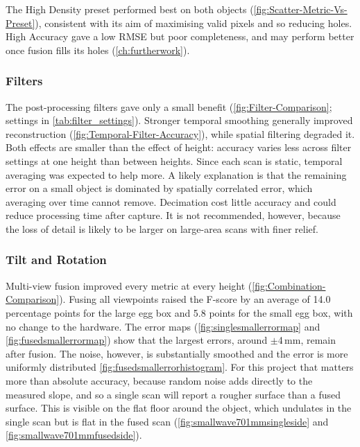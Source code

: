 The High Density preset performed best on both objects (\autoref{fig:Scatter-Metric-Vs-Preset}), consistent with its aim of maximising valid pixels and so reducing holes. High Accuracy gave a low RMSE but poor completeness, and may perform better once fusion fills its holes (\autoref{ch:furtherwork}).

\subsubsection{Filters}

The post-processing filters gave only a small benefit (\autoref{fig:Filter-Comparison}; settings in \autoref{tab:filter_settings}). Stronger temporal smoothing generally improved reconstruction (\autoref{fig:Temporal-Filter-Accuracy}), while spatial filtering degraded it. Both effects are smaller than the effect of height: accuracy varies less across filter settings at one height than between heights. Since each scan is static, temporal averaging was expected to help more. A likely explanation is that the remaining error on a small object is dominated by spatially correlated error, which averaging over time cannot remove. Decimation cost little accuracy and could reduce processing time after capture. It is not recommended, however, because the loss of detail is likely to be larger on large-area scans with finer relief.

\subsubsection{Tilt and Rotation}

Multi-view fusion improved every metric at every height (\autoref{fig:Combination-Comparison}). Fusing all viewpoints raised the F-score by an average of 14.0 percentage points for the large egg box and 5.8 points for the small egg box, with no change to the hardware. The error maps (\autoref{fig:singlesmallerrormap} and \autoref{fig:fusedsmallerrormap}) show that the largest errors, around $\pm$4\,mm, remain after fusion. The noise, however, is substantially smoothed and the error is more uniformly distributed \autoref{fig:fusedsmallerrorhistogram}. For this project that matters more than absolute accuracy, because random noise adds directly to the measured slope, and so a single scan will report a rougher surface than a fused surface. This is visible on the flat floor around the object, which undulates in the single scan but is flat in the fused scan (\autoref{fig:smallwave701mmsingleside} and \autoref{fig:smallwave701mmfusedside}).

